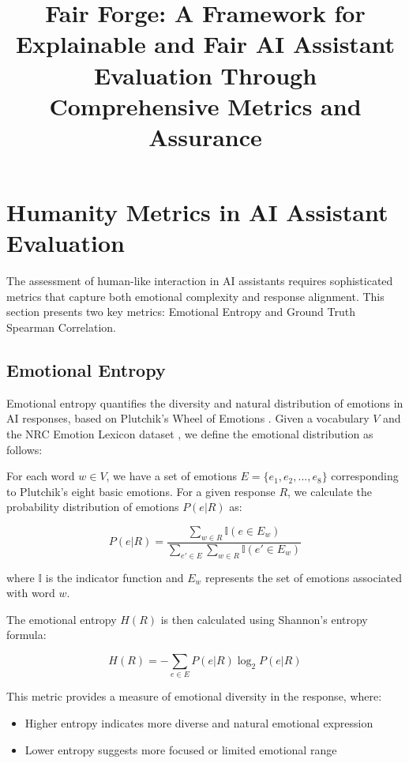 \documentclass[12pt]{article}
\title{Fair Forge: A Framework for Explainable and Fair AI Assistant Evaluation Through Comprehensive Metrics and Assurance}
\begin{document}
\maketitle

\section{Humanity Metrics in AI Assistant Evaluation}

The assessment of human-like interaction in AI assistants requires sophisticated metrics that capture both emotional complexity and response alignment. This section presents two key metrics: Emotional Entropy and Ground Truth Spearman Correlation.

\subsection{Emotional Entropy}

Emotional entropy quantifies the diversity and natural distribution of emotions in AI responses, based on Plutchik's Wheel of Emotions \cite{plutchik2001nature}. Given a vocabulary $V$ and the NRC Emotion Lexicon dataset \cite{mohammad2013nrc}, we define the emotional distribution as follows:

For each word $w \in V$, we have a set of emotions $E = \{e_1, e_2, ..., e_8\}$ corresponding to Plutchik's eight basic emotions. For a given response $R$, we calculate the probability distribution of emotions $P(e|R)$ as:

\begin{equation}
    P(e|R) = \frac{\sum_{w \in R} \mathbb{I}(e \in E_w)}{\sum_{e' \in E} \sum_{w \in R} \mathbb{I}(e' \in E_w)}
\end{equation}

where $\mathbb{I}$ is the indicator function and $E_w$ represents the set of emotions associated with word $w$.

The emotional entropy $H(R)$ is then calculated using Shannon's entropy formula:

\begin{equation}
    H(R) = -\sum_{e \in E} P(e|R) \log_2 P(e|R)
\end{equation}

This metric provides a measure of emotional diversity in the response, where:
\begin{itemize}
    \item Higher entropy indicates more diverse and natural emotional expression
    \item Lower entropy suggests more focused or limited emotional range
\end{itemize}
\end{document}
